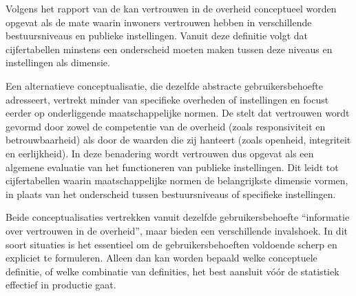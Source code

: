 \documentclass[\mainfiledir/00_handleiding_statistiekproductie.tex]{subfiles}
\begin{document}
Volgens het rapport van de \textcite{oecd2017trust} kan vertrouwen in de overheid conceptueel worden opgevat als de mate waarin inwoners vertrouwen hebben in verschillende bestuursniveaus en publieke instellingen. Vanuit deze definitie volgt dat cijfertabellen minstens een onderscheid moeten maken tussen deze niveaus en instellingen als dimensie.

Een alternatieve conceptualisatie, die dezelfde abstracte gebruikersbehoefte adresseert, vertrekt minder van specifieke overheden of instellingen en focust eerder op onderliggende maatschappelijke normen. De \citeauthor{oecd2017trust} stelt dat vertrouwen wordt gevormd door zowel de competentie van de overheid (zoals responsiviteit en betrouwbaarheid) als door de waarden die zij hanteert (zoals openheid, integriteit en eerlijkheid). In deze benadering wordt vertrouwen dus opgevat als een algemene evaluatie van het functioneren van publieke instellingen. Dit leidt tot cijfertabellen waarin maatschappelijke normen de belangrijkste dimensie vormen, in plaats van het onderscheid tussen bestuursniveaus of specifieke instellingen.

Beide conceptualisaties vertrekken vanuit dezelfde gebruikersbehoefte ``informatie over vertrouwen in de overheid'', maar bieden een verschillende invalshoek. In dit soort situaties is het essentieel om de gebruikersbehoeften voldoende scherp en expliciet te formuleren. Alleen dan kan worden bepaald welke conceptuele definitie, of welke combinatie van definities, het best aansluit vóór de statistiek effectief in productie gaat.






\end{document}
